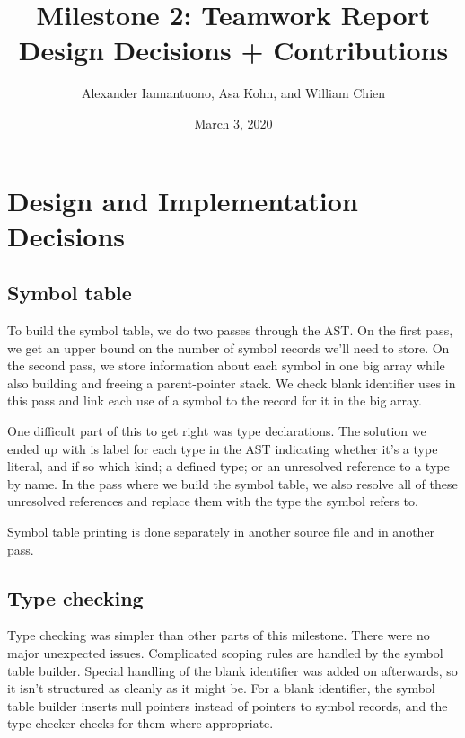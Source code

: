 \documentclass{article}
\title{
    Milestone 2: Teamwork Report\\
    \large Design Decisions + Contributions
}
\author{Alexander Iannantuono, Asa Kohn, and William Chien}
\date{March 3, 2020}
\begin{document}
\maketitle

%
%

\section{Design and Implementation Decisions}

\subsection{Symbol table}

To build the symbol table, we do two passes through the AST. On the first pass,
we get an upper bound on the number of symbol records we'll need to store. On
the second pass, we store information about each symbol in one big array while
also building and freeing a parent-pointer stack. We check blank identifier uses
in this pass and link each use of a symbol to the record for it in the big
array.

One difficult part of this to get right was type declarations. The solution we
ended up with is label for each type in the AST indicating whether it's a type
literal, and if so which kind; a defined type; or an unresolved reference to a
type by name. In the pass where we build the symbol table, we also resolve all
of these unresolved references and replace them with the type the symbol refers
to.

Symbol table printing is done separately in another source file and in another
pass.

\subsection{Type checking}

Type checking was simpler than other parts of this milestone. There were no
major unexpected issues. Complicated scoping rules are handled by the symbol
table builder. Special handling of the blank identifier was added on afterwards,
so it isn't structured as cleanly as it might be. For a blank identifier, the
symbol table builder inserts null pointers instead of pointers to symbol
records, and the type checker checks for them where appropriate.
\end{document}
